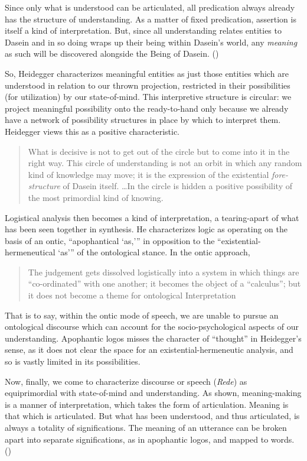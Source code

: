 \documentclass[leqno, 12pt]{turabian-researchpaper}
\begin{document}
	Since only what is understood can be articulated, all predication always already
	has the structure of understanding. As a matter of fixed predication, assertion
	is itself a kind of interpretation. But, since all understanding relates entities
	to Dasein and in so doing wraps up their being within Dasein's world, any
	\emph{meaning} as such will be discovered alongside the Being of Dasein. ()

	So, Heidegger characterizes meaningful entities as just those entities which are
	understood in relation to our thrown projection, restricted in their
	possibilities (for utilization) by our state-of-mind. This interpretive structure
	is circular: we project meaningful possibility onto the ready-to-hand only
	because we already have a network of possibility structures in place by which
	to interpret them. Heidegger views this as a positive characteristic.
	\blockquote[{}]{What is decisive is not to get out of the circle but to come into it in the right way. This circle of understanding is not an orbit in which any random kind of knowledge may move; it is the expression of the existential \emph{fore-structure} of Dasein itself. \dots In the circle is hidden a positive possibility of the most primordial kind of knowing.}

	Logistical analysis then becomes a kind of interpretation, a tearing-apart of
	what has been seen together in synthesis. He characterizes logic as operating on
	the basis of an ontic, \enquote{apophantical \enquote{as,}} in opposition to the
	\enquote{existential-hermeneutical \enquote{as}} of the ontological stance. In
	the ontic approach, \blockquote[{}]{The judgement gets dissolved logistically into a system in which things are \enquote{co-ordinated} with one another; it becomes the object of a \enquote{calculus}; but it does not become a theme for ontological Interpretation}.
	That is to say, within the ontic mode of speech, we are unable to pursue an ontological
	discourse which can account for the socio-psychological aspects of our understanding.
	Apophantic logos misses the character of \enquote{thought} in Heidegger's sense,
	as it does not clear the space for an existential-hermeneutic analysis, and so
	is vastly limited in its possibilities.

	Now, finally, we come to characterize discourse or speech (\textit{Rede}) as
	equiprimordial with state-of-mind and understanding. As shown, meaning-making
	is a manner of interpretation, which takes the form of articulation. Meaning
	is that which is articulated. But what has been understood, and thus
	articulated, is always a totality of significations. The meaning of an
	utterance can be broken apart into separate significations, as in apophantic logos,
	and mapped to words. ()
\end{document}
